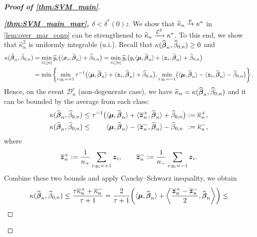 \begin{proof}[\textbf{Proof of \cref{thm:SVM_main}}]
\begin{proof}[\textbf{\emph{\ref{thm:SVM_main_mar}, $\delta < \delta^*(0)$:}}]
We show that $\widehat\kappa_n \xrightarrow{\mathrm{p}} \kappa^*$ in \cref{lem:over_mar_conp} can be strengthened to $\widehat\kappa_n \xrightarrow{\mathcal{L}^{2}} \kappa^*$. To this end, we show that $\hat\kappa_n^2$ is uniformly integrable (u.i.). Recall that $\kappa(\widehat{{\boldsymbol{\beta}}}_n, \widehat\beta_{0,n}) \ge 0$ and
\begin{align*}
        \kappa(\widehat{{\boldsymbol{\beta}}}_n, \widehat\beta_{0,n}) 
        & = \min_{i \in [n]} \widetilde y_i \bigl( \langle \text{\boldmath $x$}_i, \widehat{{\boldsymbol{\beta}}}_n \rangle + \widehat\beta_{0,n} \bigr)
        = \min_{i \in [n]} \widetilde y_i \bigl(  y_i \langle {\boldsymbol{\mu}}, \widehat{{\boldsymbol{\beta}}}_n \rangle + \langle \text{\boldmath $z$}_i, \widehat{{\boldsymbol{\beta}}}_n \rangle + \widehat\beta_{0,n} \bigr) \\
        & = \min \left\{
            \min_{i: y_i = +1}  \tau^{-1}\bigl( \langle {\boldsymbol{\mu}}, \widehat{{\boldsymbol{\beta}}}_n \rangle + \langle \text{\boldmath $z$}_i, \widehat{{\boldsymbol{\beta}}}_n \rangle + \widehat\beta_{0,n} \bigr) ,
            \min_{i: y_i = -1}  \bigl( \langle {\boldsymbol{\mu}}, \widehat{{\boldsymbol{\beta}}}_n \rangle - \langle \text{\boldmath $z$}_i, \widehat{{\boldsymbol{\beta}}}_n \rangle - \widehat\beta_{0,n}\bigr)
        \right\}.
\end{align*}
Hence, on the event $\mathcal{D}_n^c$ (non-degenerate case), we have $\widehat\kappa_n = \kappa(\widehat{{\boldsymbol{\beta}}}_n, \widehat\beta_{0,n})$ and it can be bounded by the average from each class:
\begin{equation*}
    \begin{aligned}
        \kappa(\hat\vbeta_n, \hat\beta_{0,n}) & \le \tau^{-1}\bigl( \< \vmu, \hat\vbeta_n \> + \< \bar\zz^+_n, \hat\vbeta_n \> + \hat\beta_{0,n} \bigr) := \bar \kappa_n^+ , \\
        \kappa(\hat\vbeta_n, \hat\beta_{0,n}) & \le \phantom{\tau^{-1}\bigl(} \< \vmu, \hat\vbeta_n \> - \< \bar\zz^-_n, \hat\vbeta_n \> - \hat\beta_{0,n} \phantom{\bigr)} := \bar \kappa_n^-  ,
    \end{aligned}
\end{equation*}
where
\begin{equation*}
    \overline{\text{\boldmath $z$}}^+_n := \frac{1}{n_+} \sum_{i: y_i = +1} \text{\boldmath $z$}_i,
    \qquad
    \overline{\text{\boldmath $z$}}^-_n := \frac{1}{n_-} \sum_{i: y_i = -1} \text{\boldmath $z$}_i.
\end{equation*}
Combine these two bounds and apply Cauchy--Schwarz inequality, we obtain
\begin{equation*}
        \kappa(\hat\vbeta_n, \hat\beta_{0,n})
        \le \frac{\tau \bar \kappa_n^+  +  \bar \kappa_n^-}{\tau + 1}
        = \frac{2}{\tau + 1} 
        \!
        \left(
        \< \vmu, \hat\vbeta_n \> 
        + \left\< \frac{\bar\zz^+_n - \bar\zz^-_n}{2}, \hat\vbeta_n \right\>
        \right)
        \le 

\end{equation*}
\end{proof}
\end{proof}
